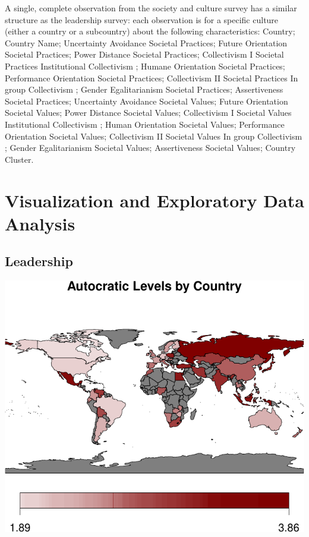 \documentclass[
]{article}
\begin{document}
A single, complete observation from the society and culture survey has a
similar structure as the leadership survey: each observation is for a
specific culture (either a country or a subcountry) about the following
characteristics: Country; Country Name; Uncertainty Avoidance Societal
Practices; Future Orientation Societal Practices; Power Distance
Societal Practices; Collectivism I Societal Practices Institutional
Collectivism ; Humane Orientation Societal Practices; Performance
Orientation Societal Practices; Collectivism II Societal Practices In
group Collectivism ; Gender Egalitarianism Societal Practices;
Assertiveness Societal Practices; Uncertainty Avoidance Societal Values;
Future Orientation Societal Values; Power Distance Societal Values;
Collectivism I Societal Values Institutional Collectivism ; Human
Orientation Societal Values; Performance Orientation Societal Values;
Collectivism II Societal Values In group Collectivism ; Gender
Egalitarianism Societal Values; Assertiveness Societal Values; Country
Cluster.

\hypertarget{visualization-and-exploratory-data-analysis}{%
\section{Visualization and Exploratory Data
Analysis}\label{visualization-and-exploratory-data-analysis}}

\hypertarget{leadership}{%
\subsection{Leadership}\label{leadership}}

\begin{center}\includegraphics[width=0.95\linewidth]{report_files/figure-latex/leadership-1} \end{center}
\end{document}
